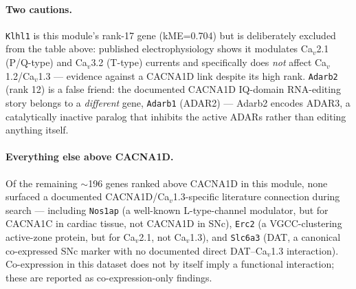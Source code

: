 \documentclass[11pt]{article}
\begin{document}
\paragraph{Two cautions.} \texttt{Klhl1} is this module's rank-17 gene
(kME=0.704) but is deliberately excluded from the table above: published
electrophysiology shows it modulates Ca$_v$2.1 (P/Q-type) and Ca$_v$3.2
(T-type) currents and specifically does \emph{not} affect Ca$_v$1.2/Ca$_v$1.3
--- evidence against a CACNA1D link despite its high rank.
\texttt{Adarb2} (rank 12) is a false friend: the documented CACNA1D
IQ-domain RNA-editing story belongs to a \emph{different} gene, \texttt{Adarb1}
(ADAR2) --- Adarb2 encodes ADAR3, a catalytically inactive paralog that
inhibits the active ADARs rather than editing anything itself.

\paragraph{Everything else above CACNA1D.} Of the remaining $\sim$196 genes
ranked above CACNA1D in this module, none surfaced a documented
CACNA1D/Ca$_v$1.3-specific literature connection during search --- including
\texttt{Nos1ap} (a well-known L-type-channel modulator, but for CACNA1C in
cardiac tissue, not CACNA1D in SNc), \texttt{Erc2} (a VGCC-clustering active-zone
protein, but for Ca$_v$2.1, not Ca$_v$1.3), and \texttt{Slc6a3} (DAT, a
canonical co-expressed SNc marker with no documented direct DAT--Ca$_v$1.3
interaction). Co-expression in this dataset does not by itself imply a
functional interaction; these are reported as co-expression-only findings.
\end{document}
